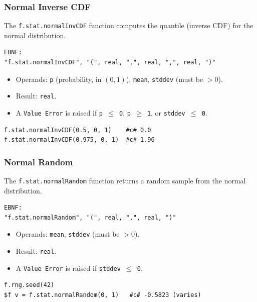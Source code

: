 \subsubsection{Normal Inverse CDF}
The \texttt{f.stat.normalInvCDF} function computes the quantile (inverse CDF) for the normal distribution.
\begin{verbatim}
EBNF:
"f.stat.normalInvCDF", "(", real, ",", real, ",", real, ")"
\end{verbatim}
\begin{itemize}
\item Operands: \texttt{p} (probability, in $(0, 1)$), \texttt{mean}, \texttt{stddev} (must be $> 0$).
\item Result: \texttt{real}.
\item A \texttt{Value Error} is raised if \texttt{p $\leq$ 0}, \texttt{p $\geq$ 1}, or \texttt{stddev $\leq$ 0}.
\end{itemize}
\begin{verbatim}
f.stat.normalInvCDF(0.5, 0, 1)    #c# 0.0
f.stat.normalInvCDF(0.975, 0, 1)  #c# 1.96
\end{verbatim}

\subsubsection{Normal Random}
The \texttt{f.stat.normalRandom} function returns a random sample from the normal distribution.
\begin{verbatim}
EBNF:
"f.stat.normalRandom", "(", real, ",", real, ")"
\end{verbatim}
\begin{itemize}
\item Operands: \texttt{mean}, \texttt{stddev} (must be $> 0$).
\item Result: \texttt{real}.
\item A \texttt{Value Error} is raised if \texttt{stddev $\leq$ 0}.
\end{itemize}
\begin{verbatim}
f.rng.seed(42)
$f v = f.stat.normalRandom(0, 1)   #c# -0.5823 (varies)
\end{verbatim}

